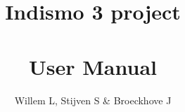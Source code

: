 \documentclass[a4paper,11pt]{report}
\title{Indismo 3 project \\ \\ User Manual}
\author{Willem L, Stijven S \& Broeckhove J}
\begin{document}
\frontpages

\mainbodypages





%

\backpages
\end{document}

